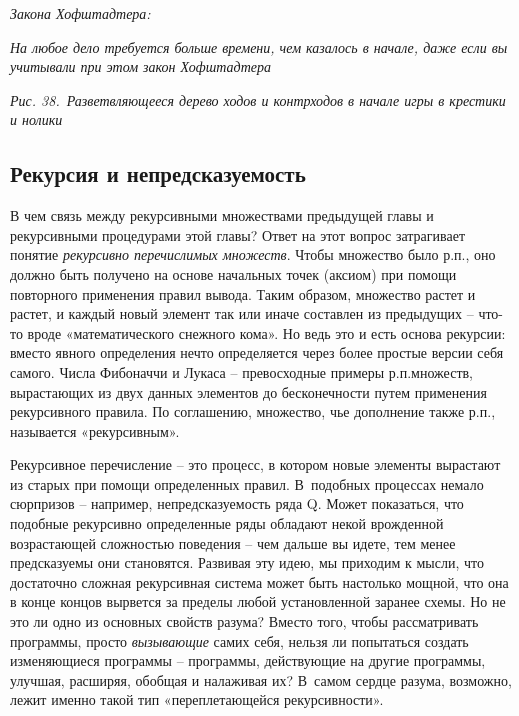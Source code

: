 \documentclass[../main.tex]{subfiles}
\begin{document}
\emph{Закона Хофштадтера:}

\emph{На любое дело требуется больше времени, чем казалось в начале, даже если вы учитывали при этом закон Хофштадтера}

\emph{Рис. 38.~Разветвляющееся дерево ходов и контрходов в начале игры в крестики и нолики}


\subsection{Рекурсия и непредсказуемость}

В чем связь между рекурсивными множествами предыдущей главы и рекурсивными процедурами этой главы? Ответ на этот вопрос затрагивает понятие \emph{рекурсивно перечислимых множеств}. Чтобы множество было р.п., оно должно быть получено на основе начальных точек (аксиом) при помощи повторного применения правил вывода. Таким образом, множество растет и растет, и каждый новый элемент так или иначе составлен из предыдущих \--- что-то вроде «математического снежного кома». Но ведь это и есть основа рекурсии: вместо явного определения нечто определяется через более простые версии себя самого. Числа Фибоначчи и Лукаса \--- превосходные примеры р.п.\@ множеств, вырастающих из двух данных элементов до бесконечности путем применения рекурсивного правила. По соглашению, множество, чье дополнение также р.п., называется «рекурсивным».

Рекурсивное перечисление \--- это процесс, в котором новые элементы вырастают из старых при помощи определенных правил. В~подобных процессах немало сюрпризов \--- например, непредсказуемость ряда Q\@. Может показаться, что подобные рекурсивно определенные ряды обладают некой врожденной возрастающей сложностью поведения \--- чем дальше вы идете, тем менее предсказуемы они становятся. Развивая эту идею, мы приходим к мысли, что достаточно сложная рекурсивная система может быть настолько мощной, что она в конце концов вырвется за пределы любой установленной заранее схемы. Но не это ли одно из основных свойств разума? Вместо того, чтобы рассматривать программы, просто \emph{вызывающие} самих себя, нельзя ли попытаться создать изменяющиеся программы \--- программы, действующие на другие программы, улучшая, расширяя, обобщая и налаживая их? В~самом сердце разума, возможно, лежит именно такой тип «переплетающейся рекурсивности».
\end{document}
